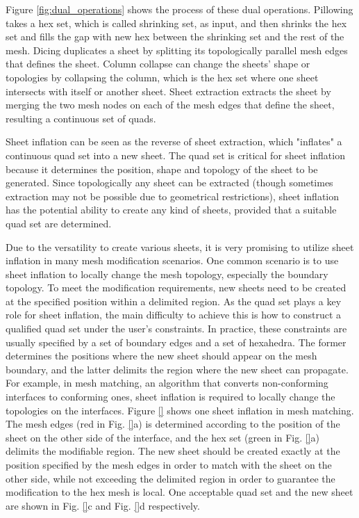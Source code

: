 \documentclass[final,5p,times,twocolumn]{elsarticle}
\begin{document}
Figure \ref{fig:dual_operations} shows the process of these dual operations. Pillowing takes a hex set, which is called shrinking set, as input, and then shrinks the hex set and fills the gap with new hex between the shrinking set and the rest of the mesh. Dicing duplicates a sheet by splitting its topologically parallel mesh edges that defines the sheet. Column collapse can change the sheets' shape or topologies by collapsing the column, which is the hex set where one sheet intersects with itself or another sheet. Sheet extraction extracts the sheet by merging the two mesh nodes on each of the mesh edges that define the sheet, resulting a continuous set of quads.

Sheet inflation can be seen as the reverse of sheet extraction, which "inflates" a continuous quad set into a new sheet. The quad set is critical for sheet inflation because it determines the position, shape and topology of the sheet to be generated. Since topologically any sheet can be extracted (though sometimes extraction may not be possible due to geometrical restrictions), sheet inflation has the potential ability to create any kind of sheets, provided that a suitable quad set are determined.

Due to the versatility to create various sheets, it is very promising to utilize sheet inflation in many mesh modification scenarios. One common scenario is to use sheet inflation to locally change the mesh topology, especially the boundary topology. To meet the modification requirements, new sheets need to be created at the specified position within a delimited region. As the quad set plays a key role for sheet inflation, the main difficulty to achieve this is how to construct a qualified quad set under the user's constraints. In practice, these constraints are usually specified by a set of boundary edges and a set of hexahedra. The former determines the positions where the new sheet should appear on the mesh boundary, and the latter delimits the region where the new sheet can propagate. For example, in mesh matching, an algorithm that converts non-conforming interfaces to conforming ones\cite{staten2010sheet,Staten:2009bo, Chen:2015kf}, sheet inflation is required to locally change the topologies on the interfaces. Figure \ref{} shows one sheet inflation in mesh matching. The mesh edges (red in Fig. \ref{}a) is determined according to the position of the sheet on the other side of the interface, and the hex set (green in Fig. \ref{}a) delimits the modifiable region. The new sheet should be created exactly at the position specified by the mesh edges in order to match with the sheet on the other side, while not exceeding the delimited region in order to guarantee the modification to the hex mesh is local. One acceptable quad set and the new sheet are shown in Fig. \ref{}c and Fig. \ref{}d respectively.
\end{document}
